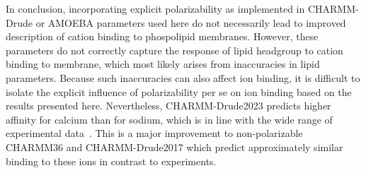 \documentclass[journal=jacsat,manuscript=article,layout=singlecolumn]{achemso}
\begin{document}



In conclusion, incorporating explicit polarizability as implemented in CHARMM-Drude or AMOEBA parameters used here do not necessarily lead to improved description of cation binding to phospolipid membranes. However, these parameters do not correctly capture the response of lipid headgroup to cation binding to membrane, which most likely arises from inaccuracies in lipid parameters. Because such inaccuracies can also affect ion binding, it is difficult to isolate the explicit influence of polarizability per se on ion binding based on the results presented here. 
Nevertheless, CHARMM-Drude2023 predicts higher affinity for calcium than for sodium, which is in line with the wide range of experimental data~\cite{Catte2016}. This is a major improvement to non-polarizable CHARMM36 and CHARMM-Drude2017 which predict approximately similar binding to these ions in contrast to experiments. 
\end{document}
